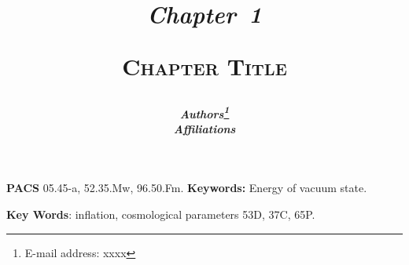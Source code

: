 \documentclass[11pt,twoside,letterpaper]{article} %
\begin{document}
\title{
{\begin{flushleft}
\vskip 0.45in
{\normalsize\bfseries\textit{Chapter~1}}
\end{flushleft}
\vskip 0.45in
\bfseries\scshape Chapter Title}}
\author{\bfseries\itshape Authors\thanks{E-mail address: xxxx}\\
Affiliations}
\date{}
\maketitle
\thispagestyle{empty}
\setcounter{page}{1}
\thispagestyle{fancy}
\fancyhead{}
\fancyfoot{}
\renewcommand{\headrulewidth}{0pt}

\vspace{2in}

\noindent \textbf{PACS} 05.45-a, 52.35.Mw, 96.50.Fm.
\vspace{.08in} \noindent \textbf{Keywords:} Energy of vacuum state.

\noindent \textbf{Key Words}: inflation, cosmological parameters
\vspace{.08in}  53D, 37C, 65P.



\pagestyle{fancy}
\fancyhead{}
\fancyhead[EL,OR]{\thepage}
\fancyfoot{}
\renewcommand\headrulewidth{0.5pt} 
\end{document}
